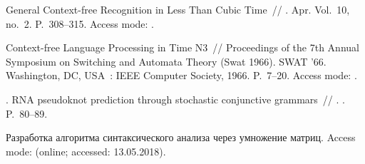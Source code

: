 \begin{thebibliography}{10}
 General Context-free Recognition in Less Than Cubic
  Time~//  \BibDash
{}. \BibDash Apr. \BibDash
\newblock Vol.~10, no.~2. \BibDash
\newblock P.~308--315. \BibDash
\newblock Access mode:
  .

 Context-free Language Processing in Time N3~//
  Proceedings of the 7th Annual Symposium on Switching and Automata Theory
  (Swat 1966). \BibDash
\newblock SWAT '66. \BibDash
\newblock Washington, DC, USA~: IEEE Computer Society, 1966. \BibDash
\newblock P.~7--20. \BibDash
\newblock Access mode: .

. RNA pseudoknot prediction
  through stochastic conjunctive grammars~// . \BibDash
{}. \BibDash
\newblock P.~80--89.

 Разработка алгоритма
  синтаксического анализа через умножение
  матриц. \BibDash
\newblock Access mode:
  (online; accessed: 13.05.2018).

\end{thebibliography}
